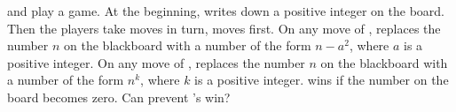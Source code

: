  and  play a game. 
At the beginning,  writes down a positive integer on the board.
Then the players take moves in turn,  moves first.
On any move of ,  replaces the number $n$ on the blackboard with a number of the form $n−a^2$, where $a$ is a positive integer.
On any move of ,  replaces the number $n$ on the blackboard with a number of the form $n^k$, where $k$ is a positive integer.
 wins if the number on the board becomes zero. Can  prevent ’s win?